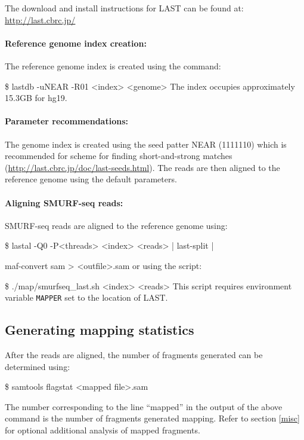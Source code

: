 \documentclass[11pt]{article}
\newenvironment{cmd}
{\list{}{
    \parsep=0em
    \itemindent=17pt
    \listparindent=50pt
    \leftmargin=0in
    \rightmargin=0in
  }\item[] \ttfamily \$}
{\endlist}
\begin{document}
The download and install instructions for LAST can be found at:
\url{http://last.cbrc.jp/}

\paragraph{Reference genome index creation:}
The reference genome index is created using the command:
\begin{cmd}
  lastdb -uNEAR -R01 <index> <genome>
\end{cmd}
The index occupies approximately 15.3GB for hg19.

\paragraph{Parameter recommendations:}
The genome index is created using the seed patter NEAR (1111110) which is
recommended for scheme for finding short-and-strong matches
(\url{http://last.cbrc.jp/doc/last-seeds.html}). The reads are then aligned
to the reference genome using the default parameters.

\paragraph{Aligning SMURF-seq reads:}
SMURF-seq reads are aligned to the reference genome using:
\begin{cmd}
  lastal -Q0 -P<threads> <index> <reads> | last-split |
    \par maf-convert sam > <outfile>.sam
\end{cmd}
or using the script:
\begin{cmd}
  ./map/smurfseq\_last.sh <index> <reads>
\end{cmd}
This script requires environment variable \texttt{MAPPER} set to the
location of LAST.




\subsection{Generating mapping statistics}
After the reads are aligned, the number of fragments generated can be
determined using:
\begin{cmd}
  samtools flagstat <mapped file>.sam
\end{cmd}

The number corresponding to the line ``mapped'' in the output of the above
command is the number of fragments generated
mapping. Refer to section \ref{misc} for optional additional analysis of
mapped fragments.
\end{document}
